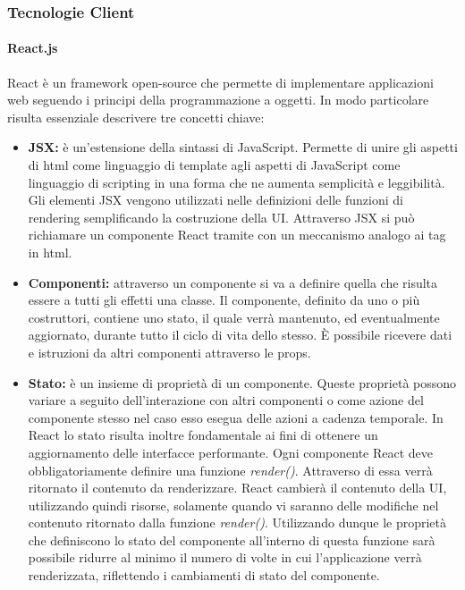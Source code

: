 \subsubsection{Tecnologie Client}

\paragraph{React.js}
React è un framework open-source che permette di implementare applicazioni web seguendo i principi della programmazione a oggetti. In modo particolare risulta essenziale descrivere tre concetti chiave:
\begin{itemize}
    \item \textbf{JSX:} è un'estensione della sintassi di JavaScript.\cite{introduzione_jsx_react} Permette di unire gli aspetti di html come linguaggio di template agli aspetti di JavaScript come linguaggio di scripting in una forma che ne aumenta semplicità e leggibilità. Gli elementi JSX vengono utilizzati nelle definizioni delle funzioni di rendering semplificando la costruzione della UI. Attraverso JSX si può richiamare un componente React tramite con un meccanismo analogo ai tag in html.
    \item \textbf{Componenti:} attraverso un componente\cite{componente_react} si va a definire quella che risulta essere a tutti gli effetti una classe. Il componente, definito da uno o più costruttori, contiene uno stato, il quale verrà mantenuto, ed eventualmente aggiornato, durante tutto il ciclo di vita dello stesso. È possibile ricevere dati e istruzioni da altri componenti attraverso le props.
    \item \textbf{Stato:} è un insieme di proprietà di un componente.\cite{state_e_lifecycle_react} Queste proprietà possono variare a seguito dell'interazione con altri componenti o come azione del componente stesso nel caso esso esegua delle azioni a cadenza temporale. In React lo stato risulta inoltre fondamentale ai fini di ottenere un aggiornamento delle interfacce performante. Ogni componente React deve obbligatoriamente definire una funzione \emph{render()}. Attraverso di essa verrà ritornato il contenuto da renderizzare. React cambierà il contenuto della UI, utilizzando quindi risorse, solamente quando vi saranno delle modifiche nel contenuto ritornato dalla funzione \emph{render()}. Utilizzando dunque le proprietà che definiscono lo stato del componente all'interno di questa funzione sarà possibile ridurre al minimo il numero di volte in cui l'applicazione verrà renderizzata, riflettendo i cambiamenti di stato del componente.    
\end{itemize}

